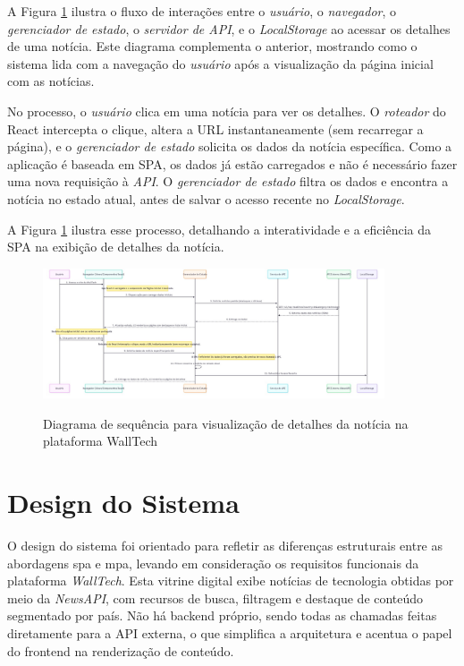 A Figura \ref{fig:sequence-diagram-details} ilustra o fluxo de interações entre o \textit{usuário}, o \textit{navegador}, o \textit{gerenciador de estado}, o \textit{servidor de API}, e o \textit{LocalStorage} ao acessar os detalhes de uma notícia. Este diagrama complementa o anterior, mostrando como o sistema lida com a navegação do \textit{usuário} após a visualização da página inicial com as notícias.

No processo, o \textit{usuário} clica em uma notícia para ver os detalhes. O \textit{roteador} do React intercepta o clique, altera a URL instantaneamente (sem recarregar a página), e o \textit{gerenciador de estado} solicita os dados da notícia específica. Como a aplicação é baseada em SPA, os dados já estão carregados e não é necessário fazer uma nova requisição à \textit{API}. O \textit{gerenciador de estado} filtra os dados e encontra a notícia no estado atual, antes de salvar o acesso recente no \textit{LocalStorage}.

A Figura \ref{fig:sequence-diagram-details} ilustra esse processo, detalhando a interatividade e a eficiência da SPA na exibição de detalhes da notícia.

\begin{figure}[H]
  \centering
  \caption{Diagrama de sequência para visualização de detalhes da notícia na plataforma WallTech}
  \includegraphics[width=0.9\textwidth]{media/wall_tech_detail_sequence_diagram.jpeg}
  \label{fig:sequence-diagram-details}
\end{figure}



\section{Design do Sistema}
\label{cap:design}

O design do sistema foi orientado para refletir as diferenças estruturais entre as abordagens \acrshort{spa} e \acrshort{mpa}, levando em consideração os requisitos funcionais da plataforma \textit{WallTech}. Esta vitrine digital exibe notícias de tecnologia obtidas por meio da \textit{NewsAPI}, com recursos de busca, filtragem e destaque de conteúdo segmentado por país. Não há backend próprio, sendo todas as chamadas feitas diretamente para a API externa, o que simplifica a arquitetura e acentua o papel do frontend na renderização de conteúdo.

